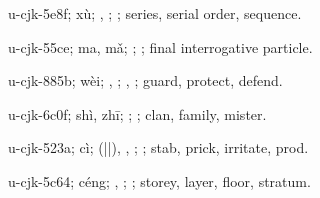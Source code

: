 \begin{multicols}{2}
{\cjkgGlue{}u-cjk-5e8f; xù; \cjkgGlue{}\cjkgGlue{}\cjkgGlue{}, \cjkgGlue{}; \cjkgGlue{}; series, serial order, sequence.

\cjkgGlue{}u-cjk-55ce; ma, mǎ; \cjkgGlue{}\cjkgGlue{}\cjkgGlue{}; \cjkgGlue{}; final interrogative particle.

\cjkgGlue{}u-cjk-885b; wèi; \cjkgGlue{}, \cjkgGlue{}; \cjkgGlue{}, \cjkgGlue{}; guard, protect, defend.

\cjkgGlue{}u-cjk-6c0f; shì, zhī; \cjkgGlue{}; \cjkgGlue{}; clan, family, mister.

\cjkgGlue{}u-cjk-523a; cì; \cjkgGlue{}\cjkgGlue{}(\cjkgGlue{}|\cjkgGlue{}|\cjkgGlue{}), \cjkgGlue{}, \cjkgGlue{}; \cjkgGlue{}; stab, prick, irritate, prod.

\cjkgGlue{}u-cjk-5c64; céng; \cjkgGlue{}, \cjkgGlue{}; \cjkgGlue{}; storey, layer, floor, stratum.

}
\end{multicols}
